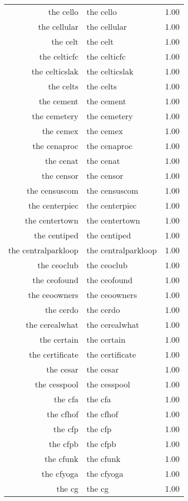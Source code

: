 \begin{table}[ht]
\begin{tabular}{rlr}
  the cello & the cello & 1.00 \\ 
  the cellular & the cellular & 1.00 \\ 
  the celt & the celt & 1.00 \\ 
  the celticfc & the celticfc & 1.00 \\ 
  the celticslak & the celticslak & 1.00 \\ 
  the celts & the celts & 1.00 \\ 
  the cement & the cement & 1.00 \\ 
  the cemetery & the cemetery & 1.00 \\ 
  the cemex & the cemex & 1.00 \\ 
  the cenaproc & the cenaproc & 1.00 \\ 
  the cenat & the cenat & 1.00 \\ 
  the censor & the censor & 1.00 \\ 
  the censuscom & the censuscom & 1.00 \\ 
  the centerpiec & the centerpiec & 1.00 \\ 
  the centertown & the centertown & 1.00 \\ 
  the centiped & the centiped & 1.00 \\ 
  the centralparkloop & the centralparkloop & 1.00 \\ 
  the ceoclub & the ceoclub & 1.00 \\ 
  the ceofound & the ceofound & 1.00 \\ 
  the ceoowners & the ceoowners & 1.00 \\ 
  the cerdo & the cerdo & 1.00 \\ 
  the cerealwhat & the cerealwhat & 1.00 \\ 
  the certain & the certain & 1.00 \\ 
  the certificate & the certificate & 1.00 \\ 
  the cesar & the cesar & 1.00 \\ 
  the cesspool & the cesspool & 1.00 \\ 
  the cfa & the cfa & 1.00 \\ 
  the cfhof & the cfhof & 1.00 \\ 
  the cfp & the cfp & 1.00 \\ 
  the cfpb & the cfpb & 1.00 \\ 
  the cfunk & the cfunk & 1.00 \\ 
  the cfyoga & the cfyoga & 1.00 \\ 
  the cg & the cg & 1.00 \\ 

\end{tabular}
\end{table}
